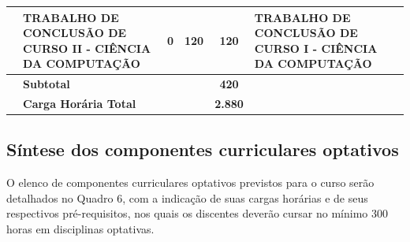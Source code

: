 \begin{center}
\begin{tiny}
\begin{longtable}{cp{4.5cm}cccp{2.8cm}p{2.8cm}}
      & TRABALHO DE CONCLUSÃO DE CURSO II - CIÊNCIA DA COMPUTAÇÃO & 0 & 120 & 120 & TRABALHO DE CONCLUSÃO DE CURSO I - CIÊNCIA DA COMPUTAÇÃO & \\ \midrule
      & \multicolumn{3}{l}{\textbf{Subtotal}} & \textbf{420} & & \\ \midrule
      & \multicolumn{3}{l}{\textbf{Carga Horária Total}} & \textbf{2.880} & & \\
    \bottomrule
\end{longtable}
\end{tiny}      
\end{center}

\subsection{Síntese dos componentes curriculares optativos}

O elenco de componentes curriculares optativos previstos para o curso serão detalhados no Quadro 6, com a indicação de suas cargas horárias e de seus respectivos pré-requisitos, nos quais os discentes deverão cursar no mínimo 300 horas em disciplinas optativas.

